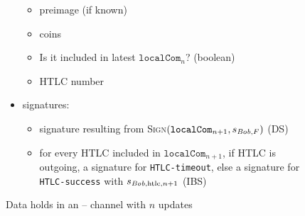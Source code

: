 \begin{figure}
\begin{mdframed}
\begin{itemize}
\begin{itemize}
          \item preimage (if known)
          \item coins
          \item Is it included in latest $\mathtt{localCom}_n$? (boolean)
          \item HTLC number
        \end{itemize}
      \item signatures:
      \begin{itemize}
        \item signature resulting from \textsc{Sign}$(\mathtt{localCom}_{n+1},
        s_{\mathit{Bob}, F})$ (DS)
        \item for every HTLC included in $\mathtt{localCom}_{n+1}$, if HTLC is
        outgoing, a signature for \texttt{HTLC-timeout}, else a signature for
        \texttt{HTLC-success} with $s_{\mathit{Bob}, \mathrm{htlc}, n+1}$ (IBS)
      \end{itemize}
    \end{itemize}
  \end{mdframed}
  \caption{Data \alice{} holds in an \alice{} -- \bob{} channel with $n$
  updates}
  \end{figure}
